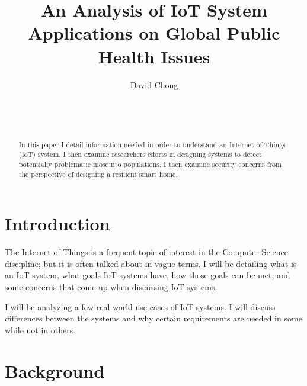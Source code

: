 \documentclass{sig-alternate}
\begin{document}

\title{An Analysis of IoT System Applications on Global Public Health Issues}


\author{
\alignauthor
David Chong\\
	\\
	\\
	\\
}

\maketitle
\begin{abstract}
In this paper I detail information needed in order to understand an Internet of Things (IoT) system. I then examine researchers efforts in designing systems to detect potentially problematic mosquito populations. I then examine security concerns from the perspective of designing a resilient smart home.
\end{abstract}


\section{Introduction}
\label{sec:introduction}

The Internet of Things is a frequent topic of interest in the Computer Science discipline; but it is often talked about in vague terms. I will be detailing what is an IoT system, what goals IoT systems have, how those goals can be met, and some concerns that come up when discussing IoT systems.

I will be analyzing a few real world use cases of IoT systems. I will discuss differences between the systems and why certain requirements are needed in some while not in others.

\section{Background}
\label{sec:background}
\end{document}
